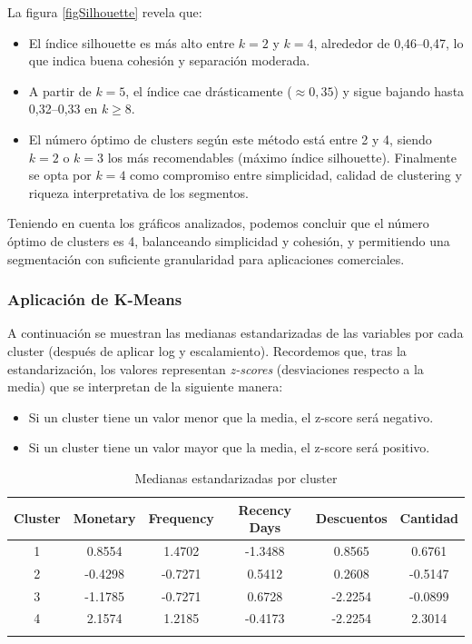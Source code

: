 La figura \ref{figSilhouette} revela que:

\begin{itemize}
\item El índice silhouette es más alto entre \(k = 2\) y \(k = 4\), alrededor de 0,46–0,47, lo que indica buena cohesión y separación moderada. 
\item A partir de \(k = 5\), el índice cae drásticamente (\(\approx 0,35\)) y sigue bajando hasta 0,32–0,33 en \(k \ge 8\).
\item El número óptimo de clusters según este método está entre 2 y 4, siendo \(k = 2\) o \(k = 3\) los más recomendables (máximo índice silhouette). Finalmente se opta por \(k = 4\) como compromiso entre simplicidad, calidad de clustering y riqueza interpretativa de los segmentos.
\end{itemize}

Teniendo en cuenta los gráficos analizados, podemos concluir que el número óptimo de clusters es 4, balanceando simplicidad y cohesión, y permitiendo una segmentación con suficiente granularidad para aplicaciones comerciales.

\newpage
\subsubsection{Aplicación de K-Means}

A continuación se muestran las medianas estandarizadas de las variables por cada cluster (después de aplicar log y escalamiento). Recordemos que, tras la estandarización, los valores representan \emph{z-scores} (desviaciones respecto a la media) que se interpretan de la siguiente manera:

\begin{itemize}
    \item Si un cluster tiene un valor menor que la media, el z-score será negativo.
    \item Si un cluster tiene un valor mayor que la media, el z-score será positivo.
\end{itemize}

\begin{table}[h!]
\centering
\caption{Medianas estandarizadas por cluster}
\begin{tabular}{c c c c c c}
\hline
\textbf{Cluster} & \textbf{Monetary} & \textbf{Frequency} & \textbf{Recency Days} & \textbf{Descuentos} & \textbf{Cantidad} \\
\hline
1 & 0.8554 & 1.4702 & -1.3488 & 0.8565 & 0.6761 \\
2 & -0.4298 & -0.7271 & 0.5412 & 0.2608 & -0.5147 \\
3 & -1.1785 & -0.7271 & 0.6728 & -2.2254 & -0.0899 \\
4 & 2.1574 & 1.2185 & -0.4173 & -2.2254 & 2.3014 \\
\hline
\label{figclust}
\end{tabular}
\end{table}


